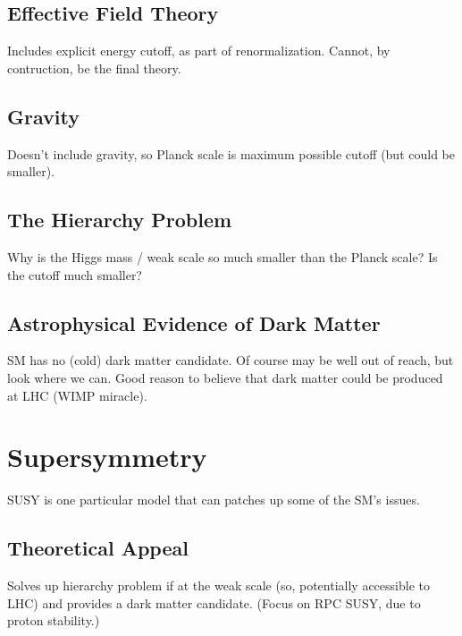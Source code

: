   \subsection{Effective Field Theory} \label{sec:effective}

  Includes explicit energy cutoff, as part of renormalization.
  Cannot, by contruction, be the final theory.

  \subsection{Gravity} \label{sec:gravity}

  Doesn't include gravity, so Planck scale is maximum possible cutoff (but could be smaller).

  \subsection{The Hierarchy Problem} \label{sec:hierarchy}

  Why is the Higgs mass / weak scale so much smaller than the Planck scale?
  Is the cutoff much smaller?

  \subsection{Astrophysical Evidence of Dark Matter} \label{sec:DMevidence}

  SM has no (cold) dark matter candidate.
  Of course may be well out of reach, but look where we can.
  Good reason to believe that dark matter could be produced at LHC (WIMP miracle).


\section{Supersymmetry} \label{sec:SUSY}

SUSY is one particular model that can patches up some of the SM's issues.

  \subsection{Theoretical Appeal} \label{sec:SUSYappeal}

  Solves up hierarchy problem if at the weak scale (so, potentially accessible to LHC) and provides a dark matter candidate.
  (Focus on RPC SUSY, due to proton stability.)

